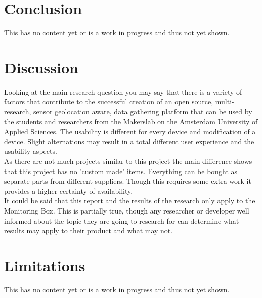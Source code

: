 \documentclass[conference]{IEEEtran}
\begin{document}
\section{Conclusion}
	This has no content yet or is a work in progress and thus not yet shown.

\section{Discussion}
	Looking at the main research question you may say that there is a variety of factors that contribute to the successful creation of an open source, multi-research, sensor geolocation aware, data gathering platform that can be used by the students and researchers from the Makerslab on the Amsterdam University of Applied Sciences. The usability is different for every device and modification of a device. Slight alternations may result in a total different user experience and the usability aspects. \\
	As there are not much projects similar to this project the main difference shows that this project has no 'custom made' items. Everything can be bought as separate parts from different suppliers. Though this requires some extra work it provides a higher certainty of availability. \\
	It could be said that this report and the results of the research only apply to the Monitoring Box. This is partially true, though any researcher or developer well informed about the topic they are going to research for can determine what results may apply to their product and what may not.

\section{Limitations}
	This has no content yet or is a work in progress and thus not yet shown.



\end{document}
